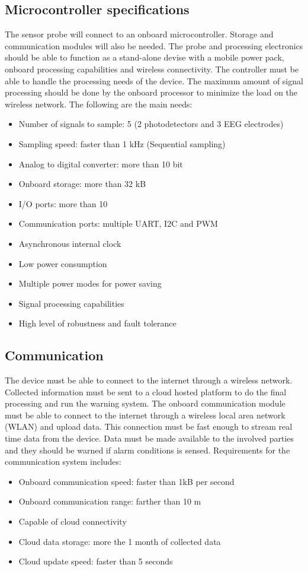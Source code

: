 \subsection{Microcontroller specifications}
The sensor probe will connect to an onboard microcontroller. Storage and communication modules will also be needed. The probe and processing electronics should be able to function as a stand-alone devise with a mobile power pack, onboard processing capabilities and wireless connectivity. The controller must be able to handle the processing needs of the device. The maximum amount of signal processing should be done by the onboard processor to minimize the load on the wireless network. The following are the main needs:
\begin{itemize}
  \item Number of signals to sample: 5 (2 photodetectors and 3 EEG electrodes)
  \item Sampling speed: faster than 1 kHz (Sequential sampling)
  \item Analog to digital converter: more than 10 bit
  \item Onboard storage: more than 32 kB
  \item I/O ports: more than 10
  \item Communication ports: multiple UART, I2C and PWM
  \item Asynchronous internal clock
  \item Low power consumption
  \item Multiple power modes for power saving
  \item Signal processing capabilities
  \item High level of robustness and fault tolerance
\end{itemize}

\subsection{Communication}
The device must be able to connect to the internet through a wireless network. Collected information must be sent to a cloud hosted platform to do the final processing and run the warning system. The onboard communication module must be able to connect to the internet through a wireless local area network (WLAN) and upload data. This connection must be fast enough to stream real time data from the device. Data must be made available to the involved parties and they should be warned if alarm conditions is sensed. Requirements for the communication system includes:
\begin{itemize}
  \item Onboard communication speed: faster than 1kB per second
  \item Onboard communication range: farther than 10 m
  \item Capable of cloud connectivity
  \item Cloud data storage: more the 1 month of collected data
  \item Cloud update speed: faster than 5 seconds
\end{itemize}

